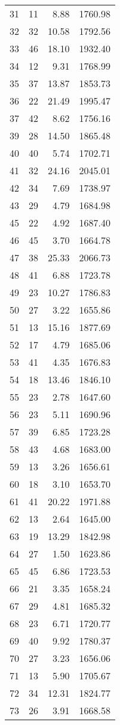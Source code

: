 \begin{appendix}
\begin{compacttable}
\begin{longtable}{@{}rrrr@{}}
31 & 11 & 8.88 & 1760.98 \\
32 & 32 & 10.58 & 1792.56 \\
33 & 46 & 18.10 & 1932.40 \\
34 & 12 & 9.31 & 1768.99 \\
35 & 37 & 13.87 & 1853.73 \\
36 & 22 & 21.49 & 1995.47 \\
37 & 42 & 8.62 & 1756.16 \\
39 & 28 & 14.50 & 1865.48 \\
40 & 40 & 5.74 & 1702.71 \\
41 & 32 & 24.16 & 2045.01 \\
42 & 34 & 7.69 & 1738.97 \\
43 & 29 & 4.79 & 1684.98 \\
45 & 22 & 4.92 & 1687.40 \\
46 & 45 & 3.70 & 1664.78 \\
47 & 38 & 25.33 & 2066.73 \\
48 & 41 & 6.88 & 1723.78 \\
49 & 23 & 10.27 & 1786.83 \\
50 & 27 & 3.22 & 1655.86 \\
51 & 13 & 15.16 & 1877.69 \\
52 & 17 & 4.79 & 1685.06 \\
53 & 41 & 4.35 & 1676.83 \\
54 & 18 & 13.46 & 1846.10 \\
55 & 23 & 2.78 & 1647.60 \\
56 & 23 & 5.11 & 1690.96 \\
57 & 39 & 6.85 & 1723.28 \\
58 & 43 & 4.68 & 1683.00 \\
59 & 13 & 3.26 & 1656.61 \\
60 & 18 & 3.10 & 1653.70 \\
61 & 41 & 20.22 & 1971.88 \\
62 & 13 & 2.64 & 1645.00 \\
63 & 19 & 13.29 & 1842.98 \\
64 & 27 & 1.50 & 1623.86 \\
65 & 45 & 6.86 & 1723.53 \\
66 & 21 & 3.35 & 1658.24 \\
67 & 29 & 4.81 & 1685.32 \\
68 & 23 & 6.71 & 1720.77 \\
69 & 40 & 9.92 & 1780.37 \\
70 & 27 & 3.23 & 1656.06 \\
71 & 13 & 5.90 & 1705.67 \\
72 & 34 & 12.31 & 1824.77 \\
73 & 26 & 3.91 & 1668.58 \\
\end{longtable}
\end{compacttable}


\end{appendix}
